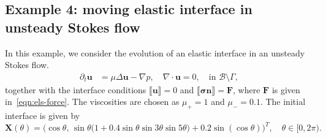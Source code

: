 \documentclass[preprint,11pt]{elsarticle}
\theoremstyle{remark}
\newcommand{\paren}[1]{\left(#1\right)}
\newcommand{\jump}[1]{\llbracket#1\rrbracket}
\newcommand{\grad}[1]{\nabla #1}
\newcommand{\mc}[1]{\mathcal{#1}}
\newcommand{\bm}[1]{\boldsymbol{#1}}
\begin{document}
\subsection{Example 4: moving elastic interface in unsteady Stokes flow}
In this example, we consider the evolution of an elastic interface in an unsteady Stokes flow.
\begin{align}\label{eqn:unsteady-stokes}
    \partial_t \bm u &= \mu \Delta \bm u - \grad p, 
    \quad \grad\cdot\bm u = 0, 
    \quad \text{in } \mc B \setminus \Gamma,
\end{align}
together with the interface conditions $\jump{\bm u} = 0$ and $\jump{\bm \sigma \bm n} = \bm F$, where $\bm F$ is given in~\eqref{eqn:els-force}.
The viscosities are chosen as $\mu_+ = 1$ and $\mu_- = 0.1$.
The initial interface is given by
\begin{equation}
    \bm X(\theta) = \Big(
        \cos\theta,\,
        \sin\theta\big(1 + 0.4 \sin\theta \sin 3\theta \sin 5\theta\big) 
        + 0.2 \sin(\cos\theta)
    \Big)^T, 
    \quad \theta \in [0,2\pi).
\end{equation}
\end{document}
